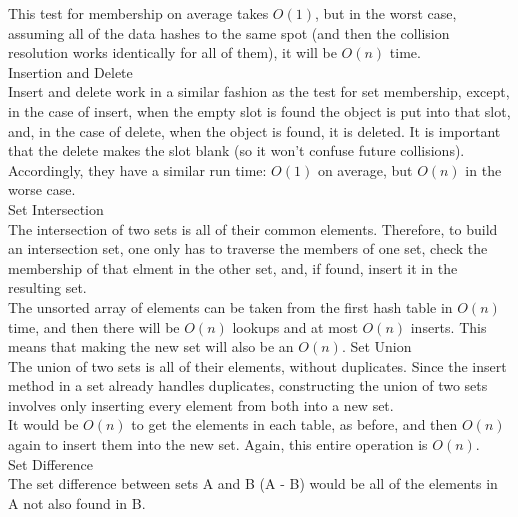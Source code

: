 \documentclass[12pt,twoside]{article}
\begin{document}
\begin{problems}
\begin{problemparts}
This test for membership on average takes $O(1)$, but in the worst case, assuming all of the data hashes to the same spot (and then the collision resolution works identically for all of them), it will be $O(n)$ time.\\

\problempart Insertion and Delete\\
Insert and delete work in a similar fashion as the test for set membership, except, in the case of insert, when the empty slot is found the object is put into that slot, and, in the case of delete, when the object is found, it is deleted.  It is important that the delete makes the slot blank (so it won't confuse future collisions).  Accordingly, they have a similar run time: $O(1)$ on average, but $O(n)$ in the worse case.\\

\problempart Set Intersection\\
The intersection of two sets is all of their common elements.  Therefore, to build an intersection set, one only has to traverse the members of one set, check the membership of that elment in the other set, and, if found, insert it in the resulting set.\\

The unsorted array of elements can be taken from the first hash table in $O(n)$ time, and then there will be $O(n)$ lookups and at most $O(n)$ inserts.  This means that making the new set will also be an $O(n)$.
\problempart Set Union\\
The union of two sets is all of their elements, without duplicates.  Since the insert method in a set already handles duplicates, constructing the union of two sets involves only inserting every element from both into a new set.\\

It would be $O(n)$ to get the elements in each table, as before, and then $O(n)$ again to insert them into the new set. Again, this entire operation is $O(n)$.\\

\problempart Set Difference\\
The set difference between sets A and B (A - B) would be all of the elements in A not also found in B.  \\


\end{problemparts}
\end{problems}
\end{document}
